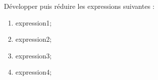 \documentclass[exercice]{thedocument}%
\begin{document}
%
Développer puis réduire les expressions suivantes :
\begin{enumerate}
    \item \<expression1;
    \item \<expression2;
    \item \<expression3;
    \item \<expression4;
\end{enumerate}
\end{document}
